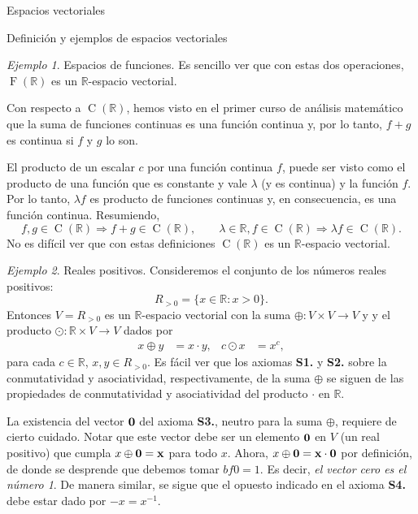 \documentclass[a4paper,12pt,twoside,spanish,reqno]{amsbook}
\numberwithin{equation}{section}
\theoremstyle{definition}
\theoremstyle{remark}
\newtheorem*{ejemplo*}{Ejemplo}
\newcommand{\R}{\mathbb R}
\begin{document}
\begin{chapter}{Espacios vectoriales}
\begin{section}{Definición y ejemplos de espacios vectoriales}
\begin{ejemplo*}{\sc Espacios de funciones.}
                Es sencillo ver que con estas dos operaciones, $\operatorname{F}(\R)$ es un $\R$-espacio vectorial.
                
                Con respecto a $\operatorname{C}(\R)$, hemos visto en el primer curso de análisis matemático  que la suma de funciones continuas es una función continua y, por lo tanto, $f+g$ es continua si $f$ y $g$ lo son.  
                
                El producto de un escalar $c$ por una función continua $f$,  puede ser visto como el producto de una función que es constante y vale $\lambda $ (y es continua) y la función $f$. Por lo tanto, $\lambda f$ es producto de funciones continuas y, en consecuencia, es una función continua.  Resumiendo,
                \begin{equation*}
                f, g \in \operatorname{C}(\R) \Rightarrow f+g \in \operatorname{C}(\R), \qquad \lambda \in \R, f \in \operatorname{C}(\R) \Rightarrow \lambda f \in \operatorname{C}(\R).
                \end{equation*}
                No es difícil ver que con estas definiciones $\operatorname{C}(\R)$  es un $\R$-espacio vectorial.
            \end{ejemplo*}
            
            
            
            \medspace
            
            \begin{ejemplo*}{\sc Reales positivos.}
            Consideremos el conjunto de los números reales positivos:
            \[
            R_{>0}=\{x\in\R : x>0\}.
            \]
            Entonces $V=R_{>0}$ es un $\R$-espacio vectorial con la suma $\oplus:V\times V\to V$ y  y el producto $\odot:\R\times V\to V$ dados por
            \begin{align*}
            x\oplus y&=x\cdot y, & c\odot x&=x^c,
            \end{align*}
            para cada $c\in\R$, $x,y\in R_{>0}$.
Es fácil ver que los axiomas \textbf{S1.} y \textbf{S2.} sobre la conmutatividad y asociatividad, respectivamente, de la suma $\oplus$ se siguen de las propiedades de conmutatividad y asociatividad del producto $\cdot$ en $\R$.

La existencia del vector $\bf0$ del axioma \textbf{S3.}, neutro para la suma $\oplus$, requiere de cierto cuidado. Notar que este vector debe ser un elemento $\bf0$ en $V$ (un real positivo) que cumpla $x\oplus \bf 0=x$ para todo $x$. Ahora, $x\oplus \bf0=x\cdot \bf0$ por definición, de donde se desprende que debemos tomar $bf0=1$. Es decir, {\it el vector cero es el número 1}. De manera similar, se sigue que el opuesto indicado en el  axioma \textbf{S4.} debe estar dado por $-x=x^{-1}$.


\end{ejemplo*}
\end{section}
\end{chapter}
\end{document}

